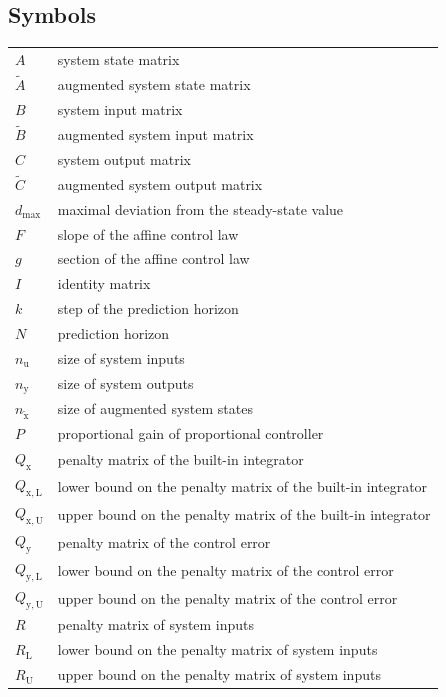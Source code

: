 \documentclass[preprint,12pt]{elsarticle}
\begin{document}
	\subsection*{Symbols}
		\begin{tabular}{ l l }
			$A$ & system state matrix \\
			$\widetilde{A}$ & augmented system state matrix \\
			$B$ & system input matrix \\
			$\widetilde{B}$ & augmented system input matrix \\
			$C$ & system output matrix \\
			$\widetilde{C}$ & augmented system output matrix \\
			$d_{\max}$ & maximal deviation from the steady-state value \\
			$F$ & slope of the affine control law \\
			$g$ & section of the affine control law \\
			$I$ & identity matrix \\
			$k$ & step of the prediction horizon \\
			$N$ & prediction horizon \\
			$n_{\mathrm{u}}$ & size of system inputs \\
			$n_{\mathrm{y}}$ & size of system outputs \\
			$n_{\widetilde{\mathrm{x}}}$ & size of augmented system states \\
			$P$ & proportional gain of proportional controller\\
			$Q_{\mathrm{x}}$ & penalty matrix of the built-in integrator \\
			$Q_{\mathrm{x,L}}$ & lower bound on the penalty matrix of the built-in integrator \\
			$Q_{\mathrm{x,U}}$ & upper bound on the penalty matrix of the built-in integrator \\
			$Q_{\mathrm{y}}$ & penalty matrix of the control error \\
			$Q_{\mathrm{y,L}}$ & lower bound on the penalty matrix of the control error \\
			$Q_{\mathrm{y,U}}$ & upper bound on the penalty matrix of the control error \\
			$R$ & penalty matrix of system inputs \\
			$R_{\mathrm{L}}$ & lower bound on the penalty matrix of system inputs \\
			$R_{\mathrm{U}}$ & upper bound on the penalty matrix of system inputs \\

\end{tabular}
\end{document}
